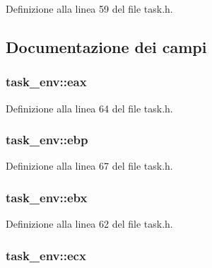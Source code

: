 Definizione alla linea 59 del file task.\+h.



\subsection{Documentazione dei campi}
\hypertarget{structtask__env_a617049724b4b79278b4fe107d9df7e3e}{
\subsubsection[{eax}]{ task\+\_\+env\+::eax}}\label{structtask__env_a617049724b4b79278b4fe107d9df7e3e}


Definizione alla linea 64 del file task.\+h.

\hypertarget{structtask__env_a6630718bd69f6876f2ff74299316ae47}{
\subsubsection[{ebp}]{ task\+\_\+env\+::ebp}}\label{structtask__env_a6630718bd69f6876f2ff74299316ae47}


Definizione alla linea 67 del file task.\+h.

\hypertarget{structtask__env_a8594000ef53ff5bb74343e54648fd5e1}{
\subsubsection[{ebx}]{ task\+\_\+env\+::ebx}}\label{structtask__env_a8594000ef53ff5bb74343e54648fd5e1}


Definizione alla linea 62 del file task.\+h.

\hypertarget{structtask__env_a069a27e98e74717519066b7e73e9bc0e}{
\subsubsection[{ecx}]{ task\+\_\+env\+::ecx}}\label{structtask__env_a069a27e98e74717519066b7e73e9bc0e}



